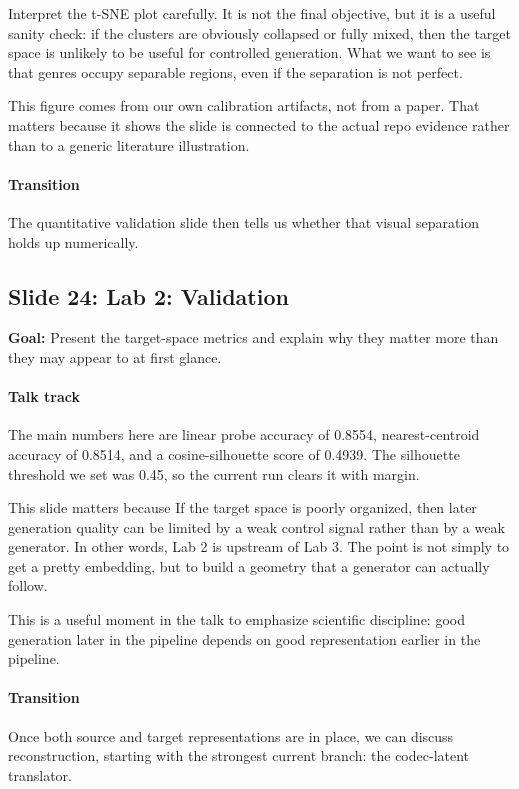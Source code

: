 \documentclass[11pt]{article}
\begin{document}
Interpret the t-SNE plot carefully. It is not the final objective, but it is a useful sanity check: if the clusters are obviously collapsed or fully mixed, then the target space is unlikely to be useful for controlled generation. What we want to see is that genres occupy separable regions, even if the separation is not perfect.

This figure comes from our own calibration artifacts, not from a paper. That matters because it shows the slide is connected to the actual repo evidence rather than to a generic literature illustration.

\paragraph{Transition}
The quantitative validation slide then tells us whether that visual separation holds up numerically.

\subsection*{Slide 24: Lab 2: Validation}
\textbf{Goal:} Present the target-space metrics and explain why they matter more than they may appear to at first glance.
\paragraph{Talk track}
The main numbers here are linear probe accuracy of 0.8554, nearest-centroid accuracy of 0.8514, and a cosine-silhouette score of 0.4939. The silhouette threshold we set was 0.45, so the current run clears it with margin.

This slide matters because If the target space is poorly organized, then later generation quality can be limited by a weak control signal rather than by a weak generator. In other words, Lab 2 is upstream of Lab 3. The point is not simply to get a pretty embedding, but to build a geometry that a generator can actually follow.

This is a useful moment in the talk to emphasize scientific discipline: good generation later in the pipeline depends on good representation earlier in the pipeline.

\paragraph{Transition}
Once both source and target representations are in place, we can discuss reconstruction, starting with the strongest current branch: the codec-latent translator.
\end{document}
